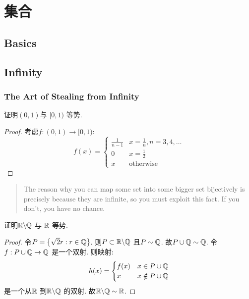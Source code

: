 \chapter{集合}
\section{Basics}
\section{Infinity}
\subsection{The Art of Stealing from Infinity}

\begin{problem}
    证明\((0,1)\)与 \([0,1)\) 等势.
\end{problem}

\begin{proof}
    考虑\(f:(0,1) \to [0,1)\):\[
        f(x) =
        \begin{cases}
            \frac{1}{n-1} & x =\frac{1}{n}, n=3,4,\dots  \\
            0 & x=\frac{1}{2} \\
            x & \text{otherwise}
        \end{cases}
    \]
\end{proof}

\begin{quote}
    The reason why you can map some set into some bigger
    set bijectively is precisely because they are infinite,
    so you must exploit this fact. If you don't, you have no chance.
\end{quote}

\begin{problem}
    证明\(\mathbb{R}\backslash \mathbb{Q} \) 与 \(\mathbb{R}\) 等势.
\end{problem}

\begin{proof}
    令\(P=\left\{ \sqrt{2}r:r \in \mathbb{Q} \right\} \).
    则\(P \subset \mathbb{R}\backslash \mathbb{Q}\) 且\(P\sim
    \mathbb{Q}\). 故\(P\cup \mathbb{Q}\sim \mathbb{Q}\). 令\(f: P\cup \mathbb{Q} \to \mathbb{Q}\) 是一个双射.
    则映射: \[
        h(x) =
        \begin{cases}
            f(x) & x\in P\cup \mathbb{Q} \\
            x & x \notin P\cup \mathbb{Q}
        \end{cases}
    \]
    是一个从\(\mathbb{R}\) 到\(\mathbb{R}\backslash \mathbb{Q}\) 的双射. 故\(\mathbb{R}\backslash
    \mathbb{Q} \sim \mathbb{R}\).
\end{proof}

